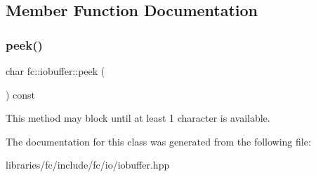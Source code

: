 \subsection{Member Function Documentation}
\mbox{\label{classfc_1_1iobuffer_a0fba1dc12428ca55e7ed8810534b1fc3}} 
\subsubsection{\texorpdfstring{peek()}{peek()}}
{\footnotesize\ttfamily char fc\+::iobuffer\+::peek (\begin{DoxyParamCaption}{ }\end{DoxyParamCaption}) const\hspace{0.3cm}{\ttfamily [inline]}}

This method may block until at least 1 character is available. 

The documentation for this class was generated from the following file\+:\begin{DoxyCompactItemize}
\item 
libraries/fc/include/fc/io/iobuffer.\+hpp\end{DoxyCompactItemize}
